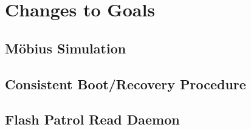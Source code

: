 \section{Changes to Goals} 

\subsection{M\"obius Simulation}


\subsection{Consistent Boot/Recovery Procedure}


\subsection{Flash Patrol Read Daemon}

